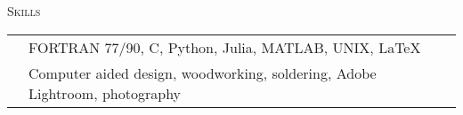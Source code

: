 \documentclass[10pt]{article}
\begin{document}
\vspace{-1.5em} 
%
%
%
\begin{multicols}{2}
\textsc{Skills}
\columnbreak

\begin {table}[H]
\begin{tabular}{l l }
\hspace{-0.6em}{Programming} & \hspace{-0.5em} FORTRAN 77/90, C, Python, Julia, MATLAB, UNIX, \LaTeX{}\\
\hspace{-0.6em}{Design     } & \hspace{-0.5em} Computer aided design, woodworking, soldering, Adobe Lightroom, photography\\
\end{tabular}	
\end{table}

\end{multicols}
\vspace{-1.5em}
\end{document}
